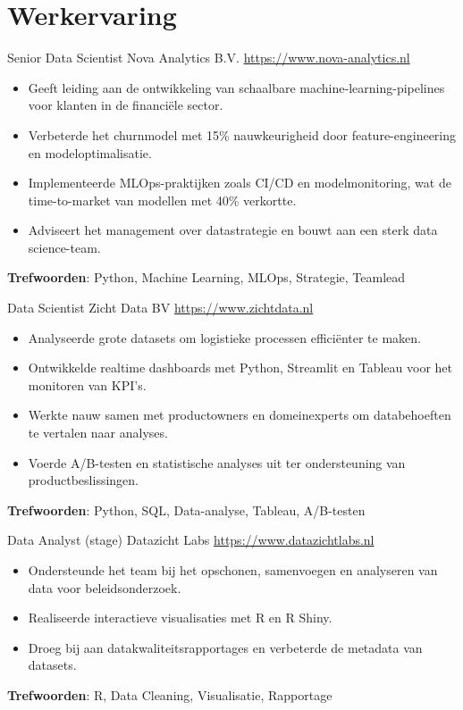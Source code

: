 \documentclass[a4paper, serif, 10pt]{moderncv}
\begin{document}
\section{Werkervaring}

        {Senior Data Scientist}
        {Nova Analytics B.V.}
        {\url{https://www.nova-analytics.nl}}
        {}
        {\begin{itemize}
\item Geeft leiding aan de ontwikkeling van schaalbare machine-learning-pipelines voor klanten in de financiële sector.
\item Verbeterde het churnmodel met 15\% nauwkeurigheid door feature-engineering en modeloptimalisatie.
\item Implementeerde MLOps-praktijken zoals CI/CD en modelmonitoring, wat de time-to-market van modellen met 40\% verkortte.
\item Adviseert het management over datastrategie en bouwt aan een sterk data science-team.
\end{itemize}
\textbf{Trefwoorden}: Python, Machine Learning, MLOps, Strategie, Teamlead}

        {Data Scientist}
        {Zicht Data BV}
        {\url{https://www.zichtdata.nl}}
        {}
        {\begin{itemize}
\item Analyseerde grote datasets om logistieke processen efficiënter te maken.
\item Ontwikkelde realtime dashboards met Python, Streamlit en Tableau voor het monitoren van KPI's.
\item Werkte nauw samen met productowners en domeinexperts om databehoeften te vertalen naar analyses.
\item Voerde A/B-testen en statistische analyses uit ter ondersteuning van productbeslissingen.
\end{itemize}
\textbf{Trefwoorden}: Python, SQL, Data-analyse, Tableau, A/B-testen}

        {Data Analyst (stage)}
        {Datazicht Labs}
        {\url{https://www.datazichtlabs.nl}}
        {}
        {\begin{itemize}
\item Ondersteunde het team bij het opschonen, samenvoegen en analyseren van data voor beleidsonderzoek.
\item Realiseerde interactieve visualisaties met R en R Shiny.
\item Droeg bij aan datakwaliteitsrapportages en verbeterde de metadata van datasets.
\end{itemize}
\textbf{Trefwoorden}: R, Data Cleaning, Visualisatie, Rapportage}
\end{document}
